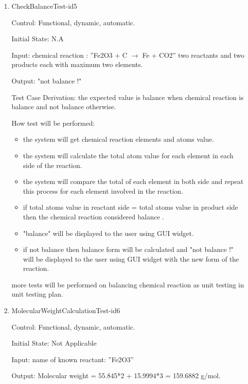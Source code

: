\documentclass[12pt, titlepage]{article}
\begin{document}
\begin{enumerate}

\item{CheckBalanceTest-id5\\}

Control: Functional, dynamic, automatic.
					
Initial State: N.A
					
Input: 
\newline
chemical reaction : ”Fe2O3 + C $\rightarrow$ Fe + CO2”
two reactants and two products each with maximum two elements.
	
Output: "not balance !"

Test Case Derivation: the expected value is balance when chemical reaction is balance and not balance otherwise. 

How test will be performed: 
\begin{itemize}
\item the system will get chemical reaction elements and atoms value. 
\item the system will calculate the total atom value for each element in each side of the reaction. 
\item the system will compare the total of each element in both side and repeat this process for each element involved in the reaction.
\item if total atoms value in reactant side = total atoms value in product side then the chemical reaction considered balance .
\item "balance" will be displayed to the user using GUI widget. 
\item if not balance then balance form will be calculated and "not balance !" will be displayed to the user using GUI widget with the new form of the reaction.
\end{itemize}

more tests will be performed on balancing chemical reaction as unit testing in unit testing plan. \cite{UnitVnVPlan}

\item{MolecularWeightCalculationTest-id6\\}

Control: Functional, dynamic, automatic.
					
Initial State: Not Applicable
					
Input: name of known reactant: ”Fe2O3”
				
Output:  Molecular weight = 55.845*2 + 15.9994*3 =  159.6882 g/mol. 


\end{enumerate}
\end{document}
